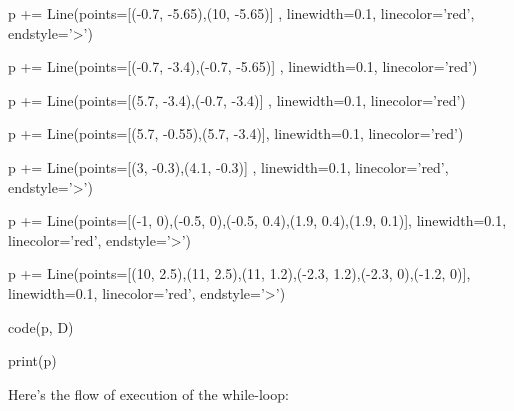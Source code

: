 \begin{python}
p += Line(points=[(-0.7, -5.65),(10, -5.65)] , linewidth=0.1, linecolor='red', endstyle='>')

p += Line(points=[(-0.7, -3.4),(-0.7, -5.65)] , linewidth=0.1, linecolor='red')

p += Line(points=[(5.7, -3.4),(-0.7, -3.4)] , linewidth=0.1, linecolor='red')

p += Line(points=[(5.7, -0.55),(5.7, -3.4)], linewidth=0.1, linecolor='red')

p += Line(points=[(3, -0.3),(4.1, -0.3)] , linewidth=0.1, linecolor='red', endstyle='>')

p += Line(points=[(-1, 0),(-0.5, 0),(-0.5, 0.4),(1.9, 0.4),(1.9, 0.1)], linewidth=0.1, linecolor='red', endstyle='>')

p += Line(points=[(10, 2.5),(11, 2.5),(11, 1.2),(-2.3, 1.2),(-2.3, 0),(-1.2, 0)], linewidth=0.1, linecolor='red', endstyle='>')


code(p, D)

print(p)
\end{python}

Here's the flow of execution of the while-loop:














         
               






